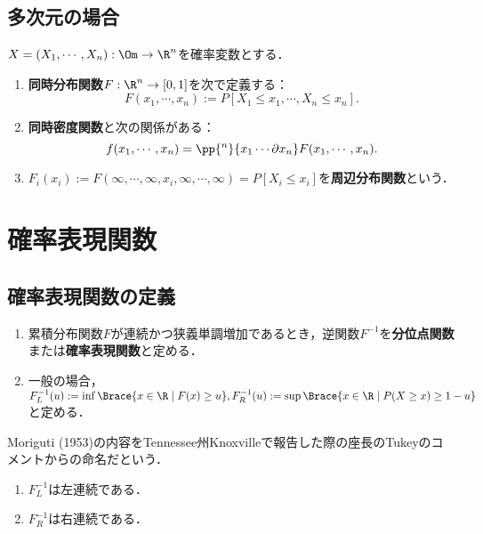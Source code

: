 \documentclass[uplatex,dvipdfmx]{jsreport}
\begin{document}
\subsection{多次元の場合}

\begin{definition}
    $X=(X_1,\cdots,X_n):\Om\to\R^n$を確率変数とする．
    \begin{enumerate}
        \item \textbf{同時分布関数}$F:\R^n\to[0,1]$を次で定義する：
        \[F(x_1,\cdots,x_n):=P[X_1\le x_1,\cdots,X_n\le x_n].\]
        \item \textbf{同時密度関数}と次の関係がある：
        \[f(x_1,\cdots,x_n)=\pp{^n}{x_1\cdots\partial x_n}F(x_1,\cdots,x_n).\]
        \item $F_i(x_i):=F(\infty,\cdots,\infty,x_i,\infty,\cdots,\infty)=P[X_i\le x_i]$を\textbf{周辺分布関数}という．
    \end{enumerate}
\end{definition}

\section{確率表現関数}

\subsection{確率表現関数の定義}

\begin{definition}\mbox{}
    \begin{enumerate}
        \item 累積分布関数$F$が連続かつ狭義単調増加であるとき，逆関数$F^{-1}$を\textbf{分位点関数}または\textbf{確率表現関数}と定める．
        \item 一般の場合，$F_L^{-1}(u):=\inf\Brace{x\in\R\mid F(x)\ge u},F_R^{-1}(u):=\sup\Brace{x\in\R\mid P(X\ge x)\ge1-u}$と定める．
    \end{enumerate}
\end{definition}
\begin{history}
    Moriguti (1953)の内容をTennessee州Knoxvilleで報告した際の座長のTukeyのコメントからの命名だという\cite{森口繁一-確率表現関数}．
\end{history}

\begin{lemma}\mbox{}
    \begin{enumerate}
        \item $F^{-1}_L$は左連続である．
        \item $F^{-1}_R$は右連続である．
    \end{enumerate}
\end{lemma}
\end{document}
